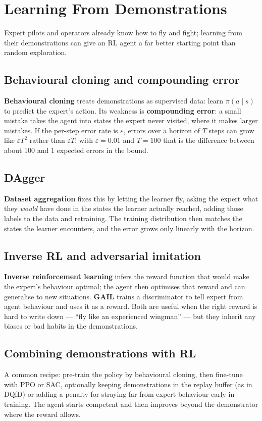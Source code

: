 \documentclass[11pt]{article}
\begin{document}
\section{Learning From Demonstrations}
Expert pilots and operators already know how to fly and fight; learning from their demonstrations can give an RL agent a far better starting point than random exploration.
\subsection{Behavioural cloning and compounding error}
\textbf{Behavioural cloning} treats demonstrations as supervised data: learn $\pi(a\mid s)$ to predict the expert's action. Its weakness is \textbf{compounding error}: a small mistake takes the agent into states the expert never visited, where it makes larger mistakes. If the per-step error rate is $\varepsilon$, errors over a horizon of $T$ steps can grow like $\varepsilon T^2$ rather than $\varepsilon T$; with $\varepsilon=0.01$ and $T=100$ that is the difference between about 100 and 1 expected errors in the bound.
\subsection{DAgger}
\textbf{Dataset aggregation} fixes this by letting the learner fly, asking the expert what they \emph{would} have done in the states the learner actually reached, adding those labels to the data and retraining. The training distribution then matches the states the learner encounters, and the error grows only linearly with the horizon.
\subsection{Inverse RL and adversarial imitation}
\textbf{Inverse reinforcement learning} infers the reward function that would make the expert's behaviour optimal; the agent then optimises that reward and can generalise to new situations. \textbf{GAIL} trains a discriminator to tell expert from agent behaviour and uses it as a reward. Both are useful when the right reward is hard to write down --- ``fly like an experienced wingman'' --- but they inherit any biases or bad habits in the demonstrations.
\subsection{Combining demonstrations with RL}
A common recipe: pre-train the policy by behavioural cloning, then fine-tune with PPO or SAC, optionally keeping demonstrations in the replay buffer (as in DQfD) or adding a penalty for straying far from expert behaviour early in training. The agent starts competent and then improves beyond the demonstrator where the reward allows.
\end{document}
